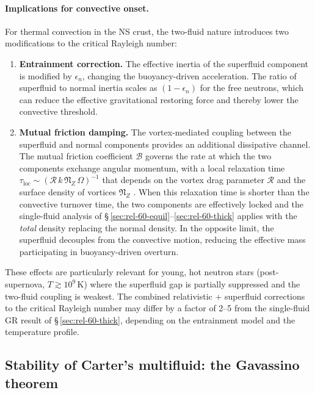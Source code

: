 \paragraph{Implications for convective onset.}
For thermal convection in the NS crust, the two-fluid nature introduces
two modifications to the critical Rayleigh number:
\begin{enumerate}
\item \textbf{Entrainment correction.}  The effective inertia of the
  superfluid component is modified by $\epsilon_{n}$, changing the
  buoyancy-driven acceleration.  The ratio of superfluid to normal
  inertia scales as $(1-\epsilon_{n})$ for the free neutrons, which can
  reduce the effective gravitational restoring force and thereby
  lower the convective threshold.

\item \textbf{Mutual friction damping.}  The vortex-mediated coupling
  between the superfluid and normal components provides an additional
  dissipative channel.  The mutual friction coefficient $\mathcal{B}$
  governs the rate at which the two components exchange angular
  momentum, with a local relaxation time
  $\tau_{\mathrm{loc}} \sim (\mathcal{R}\,k\,\mathfrak{N}_{Z}\,
  \Omega)^{-1}$ that depends on the vortex drag parameter
  $\mathcal{R}$ and the surface density of vortices $\mathfrak{N}_{Z}$
  \cite{GavassinoAntonelliPizzocheroHaskell2020}.  When this relaxation time is
  shorter than the convective turnover time, the two components are
  effectively locked and the single-fluid analysis of
  \S\,\ref{sec:rel-60-equil}--\ref{sec:rel-60-thick} applies with the
  \emph{total} density replacing the normal density.  In the opposite
  limit, the superfluid decouples from the convective motion, reducing
  the effective mass participating in buoyancy-driven overturn.
\end{enumerate}

These effects are particularly relevant for young, hot neutron stars
(post-supernova, $T\gtrsim 10^{9}\,$K) where the superfluid gap is
partially suppressed and the two-fluid coupling is weakest.  The
combined relativistic + superfluid corrections to the critical Rayleigh
number may differ by a factor of 2--5 from the single-fluid GR result
of \S\,\ref{sec:rel-60-thick}, depending on the entrainment model and the
temperature profile.

\subsection{Stability of Carter's multifluid: the Gavassino theorem}
\label{sec:rel-60-carter-stability}


